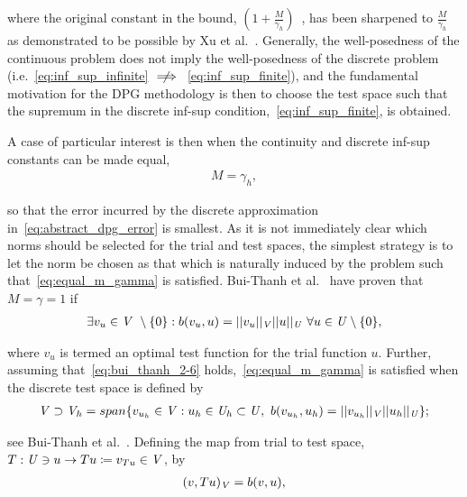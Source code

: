 where the original constant in the bound, $\left( 1 + \frac{M}{\gamma_h} \right)$~\cite[eq. ()]{Babuska1971}, has been
sharpened to $\frac{M}{\gamma_h}$ as demonstrated to be possible by Xu et al.~\cite[Theorem ]{Xu2003}.
Generally, the well-posedness of the continuous problem does not imply the well-posedness of the discrete problem
(i.e.~\eqref{eq:inf_sup_infinite} $\centernot\implies$~\eqref{eq:inf_sup_finite}), and the fundamental motivation for
the DPG methodology is then to choose the test space such that the supremum in the discrete inf-sup
condition,~\eqref{eq:inf_sup_finite}, is obtained. 

A case of particular interest is then when the continuity and discrete inf-sup constants can be made equal,
\begin{align} \label{eq:equal_m_gamma}
M = \gamma_h,
\end{align}

so that the error incurred by the discrete approximation in~\eqref{eq:abstract_dpg_error} is smallest. As it is not
immediately clear which norms should be selected for the trial and test spaces, the simplest strategy is to let the norm
be chosen as that which is naturally induced by the problem such that~\eqref{eq:equal_m_gamma} is satisfied. Bui-Thanh
et al.~\cite[Theorem ]{BuiThanh2013} have proven that $M = \gamma = 1$ if
\begin{align} \label{eq:bui_thanh_2-6}
\exists v_u \in \mathit{{{V}}}\ \setminus \{0\} :
b(v_u,u) = ||v_u||_{\mathit{{{V}}}} ||u||_{\mathit{{{U}}}}\ \forall u \in \mathit{{{U}}} \setminus \{0\},
\end{align}

where $v_u$ is termed an optimal test function for the trial function $u$. Further, assuming
that~\eqref{eq:bui_thanh_2-6} holds,~\eqref{eq:equal_m_gamma} is satisfied when the discrete test space is defined by
\begin{align} \label{eq:def_discrete_test_space}
\mathit{{{V}}} \supset \mathit{{{V}}}_h 
= span \{ v_{u_h} \in \mathit{{{V}}} : u_h \in \mathit{{{U}}}_h \subset \mathit{{{U}}},\ b(v_{u_h},u_h) 
= ||v_{u_h}||_{\mathit{{{V}}}} ||u_h||_{\mathit{{{U}}}} \};
\end{align}

see Bui-Thanh et al.~\cite[Lemma ]{BuiThanh2013}. Defining the map from trial to test space, $T :
\mathit{{{U}}} \ni u \rightarrow Tu \coloneqq v_{Tu} \in \mathit{{{V}}} $, by
\begin{align}
(v,Tu)_{\mathit{{{V}}}} = b(v,u),
\end{align}

